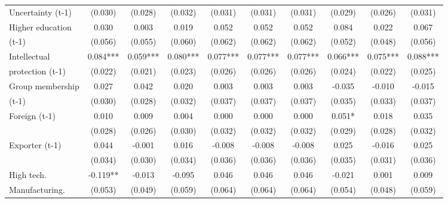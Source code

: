 \begin{table}[htbp]
\begin{tabular}{l*{9}{c}}
Uncertainty (t-1)   &     (0.030)   &     (0.028)   &     (0.032)   &     (0.031)   &     (0.031)   &     (0.031)   &     (0.029)   &     (0.026)   &     (0.031)   \\
Higher education    &       0.030   &       0.003   &       0.019   &       0.052   &       0.052   &       0.052   &       0.084   &       0.022   &       0.067   \\
(t-1)               &     (0.056)   &     (0.055)   &     (0.060)   &     (0.062)   &     (0.062)   &     (0.062)   &     (0.052)   &     (0.048)   &     (0.056)   \\
Intellectual        &       0.084***&       0.059***&       0.080***&       0.077***&       0.077***&       0.077***&       0.066***&       0.075***&       0.088***\\
protection (t-1)    &     (0.022)   &     (0.021)   &     (0.023)   &     (0.026)   &     (0.026)   &     (0.026)   &     (0.024)   &     (0.022)   &     (0.025)   \\
Group membership    &       0.027   &       0.042   &       0.020   &       0.003   &       0.003   &       0.003   &      -0.035   &      -0.010   &      -0.015   \\
(t-1)               &     (0.030)   &     (0.028)   &     (0.032)   &     (0.037)   &     (0.037)   &     (0.037)   &     (0.035)   &     (0.033)   &     (0.037)   \\
Foreign (t-1)       &       0.010   &       0.009   &       0.004   &       0.000   &       0.000   &       0.000   &       0.051*  &       0.018   &       0.035   \\
                    &     (0.028)   &     (0.026)   &     (0.030)   &     (0.032)   &     (0.032)   &     (0.032)   &     (0.029)   &     (0.028)   &     (0.032)   \\
Exporter (t-1)      &       0.044   &      -0.001   &       0.016   &      -0.008   &      -0.008   &      -0.008   &       0.025   &      -0.016   &       0.025   \\
                    &     (0.034)   &     (0.030)   &     (0.034)   &     (0.036)   &     (0.036)   &     (0.036)   &     (0.035)   &     (0.031)   &     (0.036)   \\
High tech.          &      -0.119** &      -0.013   &      -0.095   &       0.046   &       0.046   &       0.046   &      -0.021   &       0.001   &       0.009   \\
Manufacturing.      &     (0.053)   &     (0.049)   &     (0.059)   &     (0.064)   &     (0.064)   &     (0.064)   &     (0.054)   &     (0.048)   &     (0.059)   \\

\end{tabular}
\end{table}
